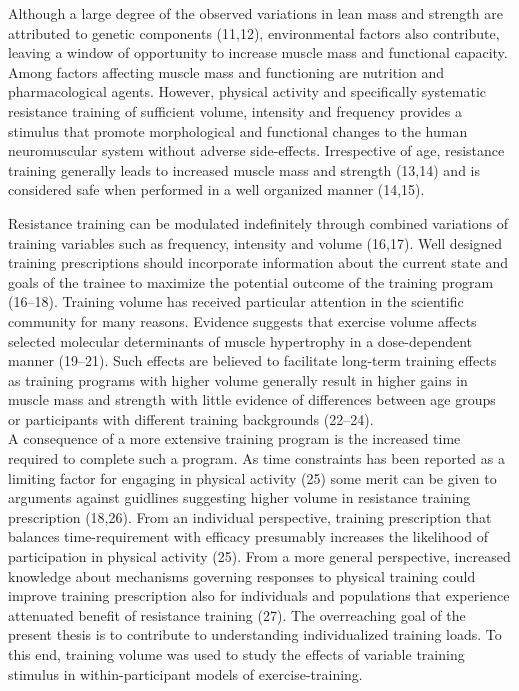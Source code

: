 \documentclass[twoside,10pt]{gihclass} %
\begin{document}
Although a large degree of the observed variations in lean mass and strength are attributed to genetic components
(11,12),
environmental factors also contribute, leaving a window of opportunity to increase muscle mass and functional capacity. Among factors affecting muscle mass and functioning are nutrition and pharmacological agents. However, physical activity and specifically systematic resistance training of sufficient volume, intensity and frequency provides a stimulus that promote morphological and functional changes to the human neuromuscular system without adverse side-effects. Irrespective of age, resistance training generally leads to increased muscle mass and strength
(13,14)
and is considered safe when performed in a well organized manner
(14,15).

Resistance training can be modulated indefinitely through combined variations of training variables such as frequency, intensity and volume
(16,17).
Well designed training prescriptions should incorporate information about the current state and goals of the trainee to maximize the potential outcome of the training program
(16--18).
Training volume has received particular attention in the scientific community for many reasons. Evidence suggests that exercise volume affects selected molecular determinants of muscle hypertrophy in a dose-dependent manner
(19--21).
Such effects are believed to facilitate long-term training effects as training programs with higher volume generally result in higher gains in muscle mass and strength with little evidence of differences between age groups or participants with different training backgrounds
(22--24). \\
A consequence of a more extensive training program is the increased time required to complete such a program. As time constraints has been reported as a limiting factor for engaging in physical activity
(25)
some merit can be given to arguments against guidlines suggesting higher volume in resistance training prescription
(18,26).
From an individual perspective, training prescription that balances time-requirement with efficacy presumably increases the likelihood of participation in physical activity (25).
From a more general perspective, increased knowledge about mechanisms governing responses to physical training could improve training prescription also for individuals and populations that experience attenuated benefit of resistance training
(27).
The overreaching goal of the present thesis is to contribute to understanding individualized training loads. To this end, training volume was used to study the effects of variable training stimulus in within-participant models of exercise-training.
\end{document}
